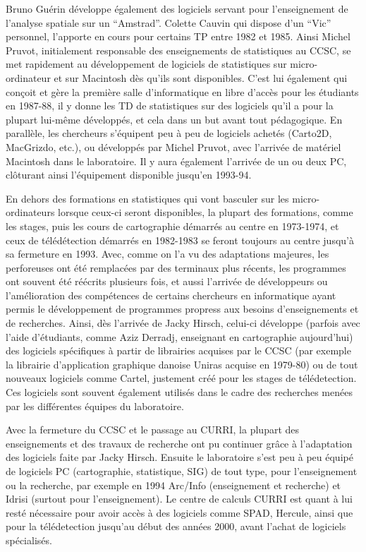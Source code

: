 Bruno Guérin développe également des logiciels servant pour l'enseignement de l'analyse spatiale sur un \enquote{Amstrad}. Colette Cauvin qui dispose d'un \enquote{Vic} personnel, l'apporte en cours pour certains TP entre 1982 et 1985. Ainsi Michel Pruvot, initialement responsable des enseignements de statistiques au CCSC, se met rapidement au développement de logiciels de statistiques sur micro-ordinateur et sur Macintosh dès qu'ils sont disponibles. C'est lui également qui conçoit et gère la première salle d'informatique en libre d'accès pour les étudiants en 1987-88, il y donne les TD de statistiques sur des logiciels qu'il a pour la plupart lui-même développés, et cela dans un but avant tout pédagogique. En parallèle, les chercheurs s'équipent peu à peu de logiciels achetés (Carto2D, MacGrizdo, etc.), ou développés par Michel Pruvot, avec l'arrivée de matériel Macintosh dans le laboratoire. Il y aura également l'arrivée de un ou deux PC, clôturant ainsi l'équipement disponible jusqu'en 1993-94.

En dehors des formations en statistiques qui vont basculer sur les micro-ordinateurs lorsque ceux-ci seront disponibles, la plupart des formations, comme les stages, puis les cours de cartographie démarrés au centre en 1973-1974, et ceux de télédétection démarrés en 1982-1983 se feront toujours au centre jusqu'à sa fermeture en 1993. Avec, comme on l'a vu des adaptations majeures, les perforeuses ont été remplacées par des terminaux plus récents, les programmes ont souvent été réécrits plusieurs fois, et aussi l'arrivée de développeurs ou l'amélioration des compétences de certains chercheurs en informatique ayant permis le développement de programmes propress aux besoins d'enseignements et de recherches. Ainsi, dès l'arrivée de Jacky Hirsch, celui-ci développe (parfois avec l'aide d'étudiants, comme Aziz Derradj, enseignant en cartographie aujourd'hui) des logiciels spécifiques à partir de librairies acquises par le CCSC (par exemple la librairie d'application graphique danoise Uniras acquise en 1979-80) ou de tout nouveaux logiciels comme Cartel, justement créé pour les stages de télédetection. Ces logiciels sont souvent également utilisés dans le cadre des recherches menées par les différentes équipes du laboratoire.

Avec la fermeture du CCSC et le passage au CURRI, la plupart des enseignements et des travaux de recherche ont pu continuer grâce à l'adaptation des logiciels faite par Jacky Hirsch. Ensuite le laboratoire s'est peu à peu équipé de logiciels PC (cartographie, statistique, SIG) de tout type, pour l'enseignement ou la recherche, par exemple en 1994 Arc/Info (enseignement et recherche) et Idrisi (surtout pour l'enseignement). Le centre de calculs CURRI est quant à lui resté nécessaire pour avoir accès à des logiciels comme SPAD, Hercule, ainsi que pour la télédetection jusqu'au début des années 2000, avant l'achat de logiciels spécialisés.

